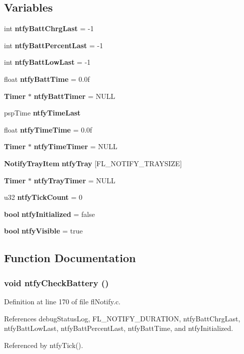 \subsection*{Variables}
\begin{CompactItemize}
\item 
int {\bf ntfy\-Batt\-Chrg\-Last} = -1
\item 
int {\bf ntfy\-Batt\-Percent\-Last} = -1
\item 
int {\bf ntfy\-Batt\-Low\-Last} = -1
\item 
float {\bf ntfy\-Batt\-Time} = 0.0f
\item 
{\bf Timer} $\ast$ {\bf ntfy\-Batt\-Timer} = NULL
\item 
psp\-Time {\bf ntfy\-Time\-Last}
\item 
float {\bf ntfy\-Time\-Time} = 0.0f
\item 
{\bf Timer} $\ast$ {\bf ntfy\-Time\-Timer} = NULL
\item 
{\bf Notify\-Tray\-Item} {\bf ntfy\-Tray} [FL\_\-NOTIFY\_\-TRAYSIZE]
\item 
{\bf Timer} $\ast$ {\bf ntfy\-Tray\-Timer} = NULL
\item 
u32 {\bf ntfy\-Tick\-Count} = 0
\item 
{\bf bool} {\bf ntfy\-Initialized} = false
\item 
{\bf bool} {\bf ntfy\-Visible} = true
\end{CompactItemize}


\subsection{Function Documentation}
\subsubsection{\setlength{\rightskip}{0pt plus 5cm}void ntfy\-Check\-Battery ()}\label{flNotify_8c_600e4ac54e9fb4dee440b5264b9e1df3}




Definition at line 170 of file fl\-Notify.c.

References debug\-Status\-Log, FL\_\-NOTIFY\_\-DURATION, ntfy\-Batt\-Chrg\-Last, ntfy\-Batt\-Low\-Last, ntfy\-Batt\-Percent\-Last, ntfy\-Batt\-Time, and ntfy\-Initialized.

Referenced by ntfy\-Tick().

